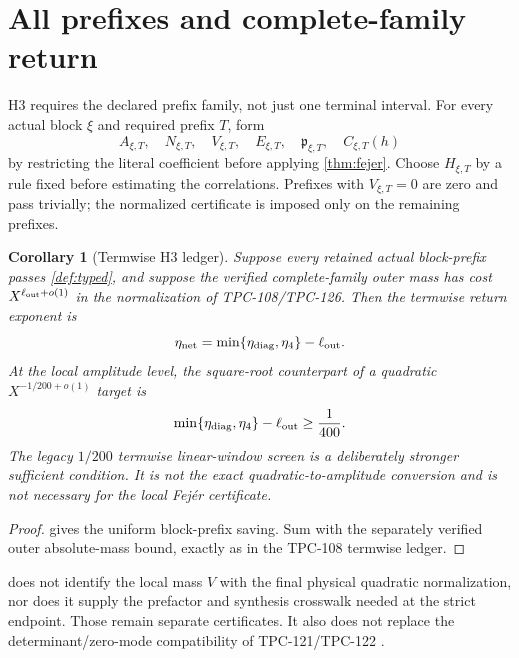 \documentclass[11pt]{article}
\newtheorem{corollary}[theorem]{Corollary}
\theoremstyle{definition}
\theoremstyle{remark}
\begin{document}
\section{All prefixes and complete-family return}

H3 requires the declared prefix family, not just one terminal
interval.  For every actual block \(\xi\) and required prefix \(T\),
form
\[
 A_{\xi,T},\quad N_{\xi,T},\quad V_{\xi,T},\quad
 E_{\xi,T},\quad\mathfrak p_{\xi,T},\quad
 C_{\xi,T}(h)
\]
by restricting the literal coefficient before applying
\cref{thm:fejer}.  Choose \(H_{\xi,T}\) by a rule fixed before
estimating the correlations.  Prefixes with \(V_{\xi,T}=0\) are
zero and pass trivially; the normalized certificate is imposed only
on the remaining prefixes.

\begin{corollary}[Termwise H3 ledger]
\label{cor:h3-ledger}
Suppose every retained actual block-prefix passes
\cref{def:typed}, and suppose the verified complete-family outer
mass has cost \(X^{\ell_{\rm out}+o(1)}\) in the normalization of
TPC-108/TPC-126.  Then the termwise return exponent is
\begin{equation}
 \eta_{\rm net}
 =
 \min\{\eta_{\rm diag},\eta_4\}-\ell_{\rm out}.
\label{eq:net}
\end{equation}
At the local amplitude level, the square-root counterpart of a
quadratic \(X^{-1/200+o(1)}\) target is
\begin{equation}
 \min\{\eta_{\rm diag},\eta_4\}
 -\ell_{\rm out}\ge\frac1{400}.
\label{eq:h3-threshold}
\end{equation}
The legacy \(1/200\) termwise linear-window screen is a deliberately
stronger sufficient condition.  It is not the exact
quadratic-to-amplitude conversion and is not necessary for the local
Fej\'er certificate.
\end{corollary}

\begin{proof}
 gives the uniform block-prefix saving.  Sum with
the separately verified outer absolute-mass bound, exactly as in
the TPC-108 termwise ledger.
\end{proof}

 does not identify the local mass \(V\) with the
final physical quadratic normalization, nor does it supply the
prefactor and synthesis crosswalk needed at the strict endpoint.
Those remain separate certificates.  It also does not replace the
determinant/zero-mode
compatibility of TPC-121/TPC-122
\citep{WangTPC121,WangTPC122}.
\end{document}
